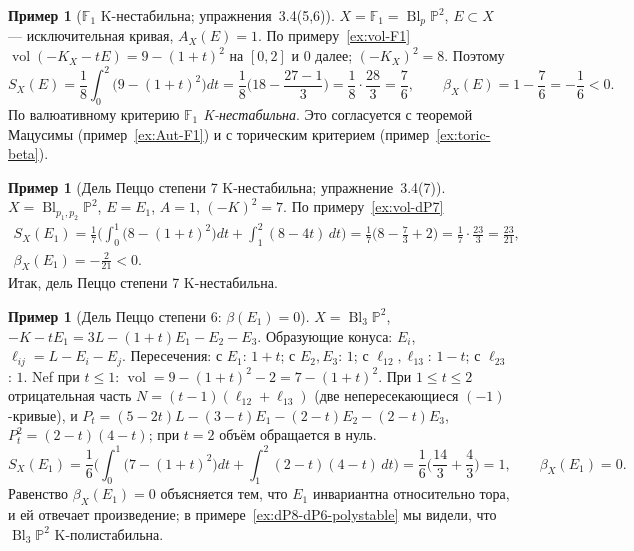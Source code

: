 \documentclass[11pt,a4paper]{article}
\theoremstyle{plain}
\theoremstyle{definition}
\newtheorem{example}[theorem]{Пример}
\theoremstyle{remark}
\newcommand{\PP}{\mathbb{P}}
\DeclareMathOperator{\Bl}{Bl}
\DeclareMathOperator{\vol}{vol}
\begin{document}
\begin{example}[$\mathbb F_1$ K-нестабильна; упражнения~3.4(5,6)]\label{ex:beta-F1}
$X=\mathbb F_1=\Bl_p\PP^2$, $E\subset X$ --- исключительная кривая, $A_X(E)=1$. По
примеру~\ref{ex:vol-F1} $\vol(-K_X-tE)=9-(1+t)^2$ на $[0,2]$ и $0$ далее; $(-K_X)^2=8$. Поэтому
\[
S_X(E)=\frac18\int_0^2\big(9-(1+t)^2\big)dt=\frac18\Big(18-\frac{27-1}3\Big)=\frac18\cdot\frac{28}3=\frac76,
\qquad\beta_X(E)=1-\frac76=-\frac16<0 .
\]
По валюативному критерию \emph{$\mathbb F_1$ K-нестабильна}. Это согласуется с теоремой Мацусимы
(пример~\ref{ex:Aut-F1}) и с торическим критерием (пример~\ref{ex:toric-beta}).
\end{example}

\begin{example}[Дель Пеццо степени 7 K-нестабильна; упражнение~3.4(7)]\label{ex:beta-dP7}
$X=\Bl_{p_1,p_2}\PP^2$, $E=E_1$, $A=1$, $(-K)^2=7$. По примеру~\ref{ex:vol-dP7}
\begin{gather*}
S_X(E_1)=\frac17\Big(\int_0^1\big(8-(1+t)^2\big)dt+\int_1^2(8-4t)\,dt\Big)
=\frac17\Big(8-\frac73+2\Big)=\frac17\cdot\frac{23}3=\frac{23}{21},\\
\beta_X(E_1)=-\frac2{21}<0 .
\end{gather*}
Итак, дель Пеццо степени 7 K-нестабильна.
\end{example}

\begin{example}[Дель Пеццо степени 6: $\beta(E_1)=0$]
$X=\Bl_3\PP^2$, $-K-tE_1=3L-(1+t)E_1-E_2-E_3$. Образующие конуса: $E_i$, $\ell_{ij}=L-E_i-E_j$.
Пересечения: с $E_1$: $1+t$; с $E_2,E_3$: $1$; с $\ell_{12},\ell_{13}$: $1-t$; с $\ell_{23}$: $1$.
Nef при $t\le1$: $\vol=9-(1+t)^2-2=7-(1+t)^2$. При $1\le t\le2$ отрицательная часть
$N=(t-1)(\ell_{12}+\ell_{13})$ (две непересекающиеся $(-1)$-кривые), и
$P_t=(5-2t)L-(3-t)E_1-(2-t)E_2-(2-t)E_3$, $P_t^2=(2-t)(4-t)$; при $t=2$ объём обращается в нуль.
\[
S_X(E_1)=\frac16\Big(\int_0^1\big(7-(1+t)^2\big)dt+\int_1^2(2-t)(4-t)\,dt\Big)=\frac16\Big(\frac{14}3+\frac43\Big)=1,
\qquad\beta_X(E_1)=0 .
\]
Равенство $\beta_X(E_1)=0$ объясняется тем, что $E_1$ инвариантна относительно тора, и ей отвечает произведение; в
примере~\ref{ex:dP8-dP6-polystable} мы видели, что $\Bl_3\PP^2$ K-полистабильна.
\end{example}
\end{document}
